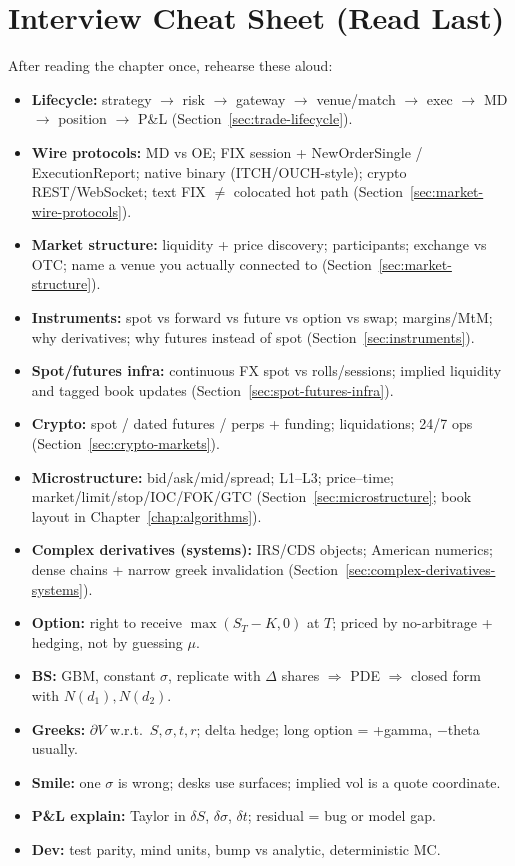 \section{Interview Cheat Sheet (Read Last)}
\label{sec:quant-interview-cheat-sheet}
After reading the chapter once, rehearse these aloud:
\begin{itemize}
    \item \textbf{Lifecycle:} strategy $\to$ risk $\to$ gateway $\to$ venue/match $\to$ 
          exec $\to$ MD $\to$ position $\to$ P\&L (Section~\ref{sec:trade-lifecycle}).
    \item \textbf{Wire protocols:} MD vs OE; FIX session + NewOrderSingle / 
          ExecutionReport; native binary (ITCH/OUCH-style); crypto REST/WebSocket; 
          text FIX $\neq$ colocated hot path 
          (Section~\ref{sec:market-wire-protocols}).
    \item \textbf{Market structure:} liquidity + price discovery; participants; 
          exchange vs OTC; name a venue you actually connected to 
          (Section~\ref{sec:market-structure}).
    \item \textbf{Instruments:} spot vs forward vs future vs option vs swap; 
          margins/MtM; why derivatives; why futures instead of spot 
          (Section~\ref{sec:instruments}).
    \item \textbf{Spot/futures infra:} continuous FX spot vs rolls/sessions; 
          implied liquidity and tagged book updates 
          (Section~\ref{sec:spot-futures-infra}).
    \item \textbf{Crypto:} spot / dated futures / perps + funding; liquidations; 
          24/7 ops (Section~\ref{sec:crypto-markets}).
    \item \textbf{Microstructure:} bid/ask/mid/spread; L1--L3; price--time; 
          market/limit/stop/IOC/FOK/GTC (Section~\ref{sec:microstructure}; 
          book layout in Chapter~\ref{chap:algorithms}).
    \item \textbf{Complex derivatives (systems):} IRS/CDS objects; American numerics; 
          dense chains + narrow greek invalidation 
          (Section~\ref{sec:complex-derivatives-systems}).
    \item \textbf{Option:} right to receive $\max(S_T-K,0)$ at $T$; priced by no-arbitrage 
          + hedging, not by guessing $\mu$.
    \item \textbf{BS:} GBM, constant $\sigma$, replicate with $\Delta$ shares $\Rightarrow$ PDE 
          $\Rightarrow$ closed form with $N(d_1), N(d_2)$.
    \item \textbf{Greeks:} $\partial V$ w.r.t.\ $S,\sigma,t,r$; delta hedge; long option = 
          +gamma, $-$theta usually.
    \item \textbf{Smile:} one $\sigma$ is wrong; desks use surfaces; implied vol is a quote 
          coordinate.
    \item \textbf{P\&L explain:} Taylor in $\delta S$, $\delta\sigma$, $\delta t$; residual 
          = bug or model gap.
    \item \textbf{Dev:} test parity, mind units, bump vs analytic, deterministic MC.
\end{itemize}

